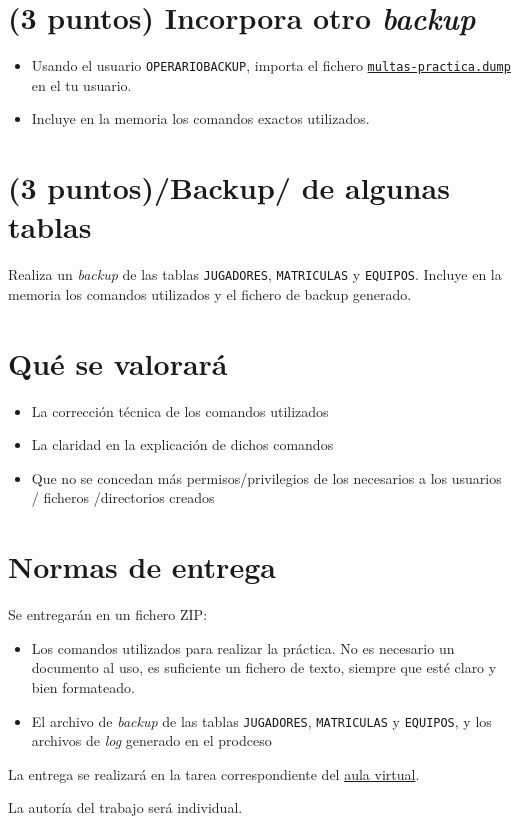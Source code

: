 \documentclass[a4paper]{article}
\begin{document}
\section*{(3 puntos) Incorpora otro \emph{backup}}
\label{sec:org000000c}
\begin{itemize}
\item Usando el usuario \texttt{OPERARIOBACKUP}, importa el fichero \href{https://alvarogonzalezsotillo.github.io/apuntes-clase/sistemas-gestores-bbdd-asir2/apuntes/2/multas-practica.dump}{\texttt{multas-practica.dump}} en el tu usuario.
\item Incluye en la memoria los comandos exactos utilizados.
\end{itemize}

\section*{(3 puntos)/Backup/ de algunas tablas}
\label{sec:org000000f}
Realiza un \emph{backup} de las tablas \texttt{JUGADORES}, \texttt{MATRICULAS} y \texttt{EQUIPOS}. Incluye en la memoria los comandos utilizados y el fichero de backup generado.  

\section*{Qué se valorará}
\label{sec:org0000012}
\begin{itemize}
\item La corrección técnica de los comandos utilizados
\item La claridad en la explicación de dichos comandos
\item Que no se concedan más permisos/privilegios de los necesarios a los usuarios / ficheros /directorios creados
\end{itemize}

\section*{Normas de entrega}
\label{sec:org0000015}
Se entregarán en un fichero ZIP:
\begin{itemize}
\item Los comandos utilizados para realizar la práctica. No es necesario un documento al uso, es suficiente un fichero de texto, siempre que esté claro y bien formateado.
\item El archivo de \emph{backup} de las tablas \texttt{JUGADORES}, \texttt{MATRICULAS} y \texttt{EQUIPOS}, y los archivos de \emph{log} generado en el prodceso
\end{itemize}

La entrega se realizará en la tarea correspondiente del \href{https://aulavirtual3.educa.madrid.org/ies.alonsodeavellan.alcala}{aula virtual}.

La autoría del trabajo será individual.
\end{document}
